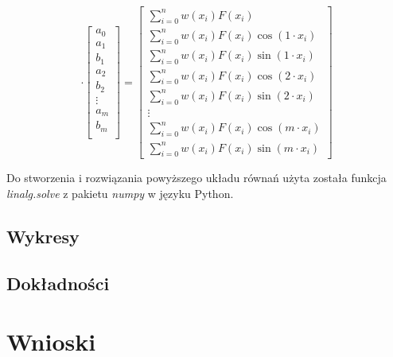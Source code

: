 \documentclass{article}
\begin{document}
\[
\cdot
\begin{bmatrix}
    a_0 \\
    a_1 \\
    b_1 \\
    a_2 \\
    b_2 \\
    \vdots \\
    a_m \\
    b_m \\ 
\end{bmatrix}
=
\begin{bmatrix}
    \sum_{i=0}^nw(x_i)F(x_i) \\
    \sum_{i=0}^nw(x_i)F(x_i)\cos(1\cdot x_i) \\
    \sum_{i=0}^nw(x_i)F(x_i)\sin(1\cdot x_i) \\
    \sum_{i=0}^nw(x_i)F(x_i)\cos(2\cdot x_i) \\
    \sum_{i=0}^nw(x_i)F(x_i)\sin(2\cdot x_i) \\
    \vdots \\
    \sum_{i=0}^nw(x_i)F(x_i)\cos(m\cdot x_i) \\ 
    \sum_{i=0}^nw(x_i)F(x_i)\sin(m\cdot x_i)
\end{bmatrix}    
\]

Do stworzenia i rozwiązania powyższego układu równań użyta została funkcja \textit{linalg.solve} z pakietu \textit{numpy}
w języku Python.

\subsection{Wykresy}



\subsection{Dokładności}

\section{Wnioski}
\end{document}
